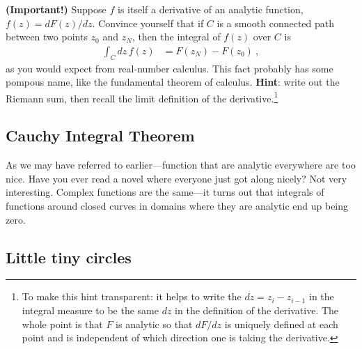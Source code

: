 \begin{exercise}\label{eq:fundamental:theorem:calculus} \textbf{(Important!)}
Suppose $f$ is itself a derivative of an analytic function, $f(z)=dF(z)/dz$.
Convince yourself that if $C$ is a smooth connected path between two points $z_0$ and $z_N$, then the integral of $f(z)$ over $C$ is
\begin{align}
  \int_C dz\, f(z) &= F(z_N) - F(z_0) \ ,
\end{align}
as you would expect from real-number calculus. This fact probably has some pompous name, like the fundamental theorem of calculus. \textbf{Hint}: write out the Riemann sum, then recall the limit definition of the derivative.\footnote{To make this hint transparent: it helps to write the $dz = z_i - z_{i-1}$ in the integral measure to be the same $dz$ in the definition of the derivative. The whole point is that $F$ is analytic so that $dF/dz$ is uniquely defined at each point and is independent of which direction one is taking the derivative.} 
\end{exercise}


 
\subsection{Cauchy Integral Theorem}

As we may have referred to earlier---function that are analytic everywhere are too nice. Have you ever read a novel where everyone just got along nicely? Not very interesting. Complex functions are the same---it turns out that integrals of functions around closed curves in domains where they are analytic end up being zero. 

\subsection{Little tiny circles}


